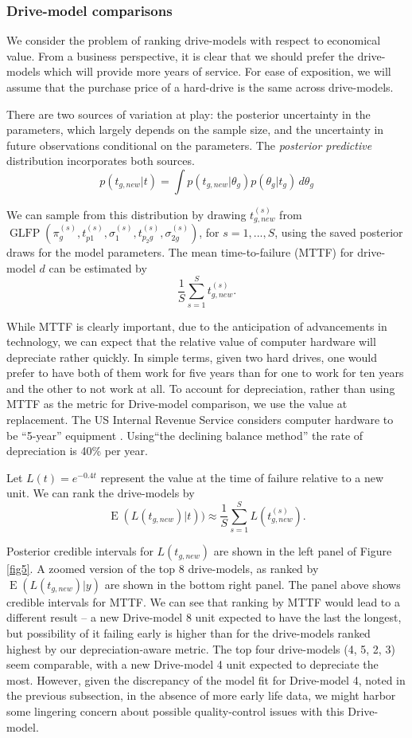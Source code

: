 \documentclass[aoas]{imsart}
\newcommand{\op}{\operatorname}
\begin{document}
\subsubsection{Drive-model comparisons}
\label{subsubsec:Drive-model comparisons}
We consider the problem of ranking drive-models with respect to economical value. From a
business perspective, it is clear
that we should prefer the drive-models which will provide more years
of service. For ease of exposition, we will assume that the purchase
price of a hard-drive is the same across drive-models.

There are two sources of variation at play: the
posterior uncertainty in the parameters, which largely depends on the
sample size, and the uncertainty in future
observations conditional on the parameters. The {\em posterior
  predictive} distribution incorporates both sources.
\begin{equation*}
  p(t_{g,new}|t) = \int p(t_{g,new}|\theta_g) p(\theta_g|t_g) \, d\theta_g
\end{equation*}

We can sample from this distribution by drawing $t_{g,new}^{(s)}$ from
$\operatorname{GLFP}(\pi_g^{(s)},
t_{p1}^{(s)},\sigma_1^{(s)},t_{p_{2}g}^{(s)},\sigma_{2g}^{(s)})$, for
$s=1,...,S$, using the saved posterior draws for the model
parameters. The mean time-to-failure (MTTF) for drive-model $d$ can be estimated by
$$\frac{1}{S} \sum_{s=1}^{S} t_{g,new}^{(s)}.$$

While MTTF is clearly important, due to the
anticipation of advancements in technology, we can expect that the
relative value of computer hardware will depreciate rather quickly. In simple terms, given two hard drives, one would prefer to have both of them work for five years than for one to work for ten years and the other to not work at all. To account
for depreciation, rather than using MTTF as the metric for Drive-model comparison, we use the value at replacement. The US Internal Revenue Service considers
computer hardware to be ``5-year'' equipment \citep{f4562}. Using``the declining
balance method'' the rate of depreciation is 40\% per year.

Let $L(t) = e^{-0.4t}$ represent the value at the time of failure
relative to a new unit. We can rank the drive-models by 
$$\op{E}(L(t_{g,new})|t))\approx \frac{1}{S} \sum_{s=1}^{S} L(t_{g,new}^{(s)}).$$

Posterior credible intervals for $L(t_{g,new})$ are shown in the left panel of Figure \ref{fig5}. A zoomed version of the top 8 drive-models, as ranked by $\op{E}(L(t_{g,new})|y)$ are shown in the bottom right panel. The panel above shows credible intervals for MTTF. We can see that ranking by MTTF would lead to a different result -- a new Drive-model 8 unit expected to have the last the longest, but possibility of it failing early is higher than for the drive-models ranked highest by our depreciation-aware metric. The top four drive-models (4, 5, 2, 3) seem comparable, with a new Drive-model 4 unit expected to depreciate the most. However, given the discrepancy of the model fit for Drive-model 4, noted in the previous subsection, in the absence of more early life data, we might harbor some lingering concern about possible quality-control issues with this Drive-model.
\end{document}

